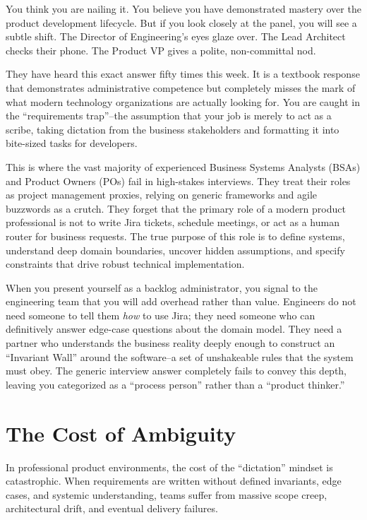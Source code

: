 \documentclass[
  11pt,
  openany,
  oneside]{book}
\begin{document}
You think you are nailing it. You believe you have demonstrated mastery
over the product development lifecycle. But if you look closely at the
panel, you will see a subtle shift. The Director of Engineering's eyes
glaze over. The Lead Architect checks their phone. The Product VP gives
a polite, non-committal nod.

They have heard this exact answer fifty times this week. It is a
textbook response that demonstrates administrative competence but
completely misses the mark of what modern technology organizations are
actually looking for. You are caught in the ``requirements trap''--the
assumption that your job is merely to act as a scribe, taking dictation
from the business stakeholders and formatting it into bite-sized tasks
for developers.

This is where the vast majority of experienced Business Systems Analysts
(BSAs) and Product Owners (POs) fail in high-stakes interviews. They
treat their roles as project management proxies, relying on generic
frameworks and agile buzzwords as a crutch. They forget that the primary
role of a modern product professional is not to write Jira tickets,
schedule meetings, or act as a human router for business requests. The
true purpose of this role is to define systems, understand deep domain
boundaries, uncover hidden assumptions, and specify constraints that
drive robust technical implementation.

When you present yourself as a backlog administrator, you signal to the
engineering team that you will add overhead rather than value. Engineers
do not need someone to tell them \emph{how} to use Jira; they need
someone who can definitively answer edge-case questions about the domain
model. They need a partner who understands the business reality deeply
enough to construct an ``Invariant Wall'' around the software--a set of
unshakeable rules that the system must obey. The generic interview
answer completely fails to convey this depth, leaving you categorized as
a ``process person'' rather than a ``product thinker.''

\section{The Cost of Ambiguity}\label{the-cost-of-ambiguity}

In professional product environments, the cost of the ``dictation''
mindset is catastrophic. When requirements are written without defined
invariants, edge cases, and systemic understanding, teams suffer from
massive scope creep, architectural drift, and eventual delivery
failures.
\end{document}
